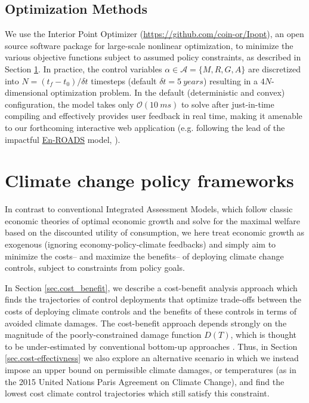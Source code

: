 \documentclass{article}
\begin{document}
\subsection{Optimization Methods}

We use the Interior Point Optimizer (\href{https://github.com/coin-or/Ipopt}{https://github.com/coin-or/Ipopt}), an open source software package for large-scale nonlinear optimization, to minimize the various objective functions subject to assumed policy constraints, as described in Section \ref{sec.policy_frameworks}. In practice, the control variables $\alpha \in \mathcal{A} = \{ M, R, G, A\}$ are discretized into $N = (t_{f} - t_{0}) / \delta t$ timesteps (default $\delta t = \SI{5}{years}$) resulting in a $4N$-dimensional optimization problem. In the default (deterministic and convex) configuration, the model takes only $\mathcal{O}(\SI{10}{ms})$ to solve after just-in-time compiling and effectively provides user feedback in real time, making it amenable to our forthcoming interactive web application (e.g. following the lead of the impactful \href{https://en-roads.climateinteractive.org/scenario.html?v=2.7.11}{En-ROADS} model, \citealt{siegel2018roads}).

\section{Climate change policy frameworks}\label{sec.policy_frameworks}

In contrast to conventional Integrated Assessment Models, which follow classic economic theories of optimal economic growth and solve for the maximal welfare based on the discounted utility of consumption, we here treat economic growth as exogenous (ignoring economy-policy-climate feedbacks) and simply aim to minimize the costs– and maximize the benefits– of deploying climate change controls, subject to constraints from policy goals.

In Section \ref{sec.cost_benefit}, we describe a cost-benefit analysis approach which finds the trajectories of control deployments that optimize trade-offs between the costs of deploying climate controls and the benefits of these controls in terms of avoided climate damages. The cost-benefit approach depends strongly on the magnitude of the poorly-constrained damage function $D(T)$, which is thought to be under-estimated by conventional bottom-up approaches \citep{ackerman_limitations_2009}. Thus, in Section \ref{sec.cost-effectivness} we also explore an alternative scenario in which we instead impose an upper bound on permissible climate damages, or temperatures (as in the 2015 United Nations Paris Agreement on Climate Change), and find the lowest cost climate control trajectories which still satisfy this constraint.
\end{document}
